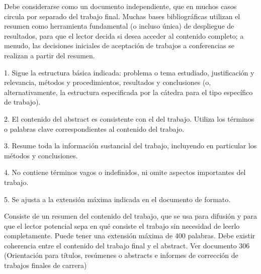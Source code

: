 \documentclass[12pt,a4paper,oneside]{book}
\begin{document}
Debe considerarse como un documento independiente, que en muchos casos circula por separado del trabajo final. Muchas bases bibliográficas utilizan el resumen como herramienta fundamental (o incluso única) de despliegue de resultados, para que el lector decida si desea acceder al contenido completo; a menudo, las decisiones iniciales de aceptación de trabajos a conferencias se realizan a partir del resumen.

\vspace{0.5 cm}
1. Sigue la estructura básica indicada: problema o tema estudiado, justificación y relevancia, métodos y procedimientos, resultados y conclusiones (o, alternativamente, la estructura especificada por la cátedra para el tipo específico de trabajo).

2. El contenido del abstract es consistente con el del trabajo. Utiliza los términos o palabras clave correspondientes al contenido del trabajo.

3. Resume toda la información sustancial del trabajo, incluyendo en particular los métodos y conclusiones.

4. No contiene términos vagos o indefinidos, ni omite aspectos importantes del trabajo.

5. Se ajusta a la extensión máxima indicada en el documento de formato.


\vspace{0.5 cm}
Consiste de un resumen del contenido del trabajo, que se usa para difusión y para que el lector potencial sepa en qué consiste el trabajo sin necesidad de leerlo completamente. Puede tener una extensión máxima de 400 palabras. Debe existir coherencia entre el contenido del trabajo final y el abstract. Ver documento 306 (Orientación para títulos, resúmenes o abstracts e informes de corrección de trabajos finales de carrera)



\end{document}

